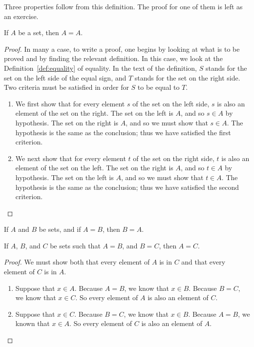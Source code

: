 \noindent Three properties follow from this definition. The proof for one of
them is left as an exercise.
\begin{lemma}
   If $A$ be a set, then $A = A$.
\label{lemma:set-identity}
   \begin{proof}
      In many a case, to write a proof, one begins by looking at what is to be
      proved and by finding the relevant definition. In this case, we look at
      the Definition~\ref{def:equality} of equality. In the text of the
      definition, $S$ stands for the set on the left side of the equal sign,
      and $T$ stands for the set on the right side. Two criteria must be
      satisfied in order for $S$ to be equal to $T$.
      \begin{enumerate}
         \item We first show that for every element $s$ of the set on the left
            side, $s$ is also an element of the set on the right.  The set on
            the left is $A$, and so $s \in A$ by hypothesis. The set on the
            right is $A$, and so we must show that $s \in A$. The hypothesis is
            the same as the conclusion; thus we have satisfied the first
            criterion.
         \item We next show that for every element $t$ of the set on the right
            side, $t$ is also an element of the set on the left.  The set on
            the right is $A$, and so $t \in A$ by hypothesis. The set on the
            left is $A$, and so we must show that $t \in A$.  The hypothesis is
            the same as the conclusion; thus we have satisfied the second
            criterion.
      \end{enumerate}
   \end{proof}
\end{lemma}

\begin{lemma}
   If $A$ and $B$ be sets, and if $A = B$, then $B = A$.
\label{lemma:set-reflexivity}
\end{lemma}

\begin{lemma}
   If $A$, $B$, and $C$ be sets such that $A = B$, and $B = C$, then $A = C$.
\label{lemma:set-transitivity}
   \begin{proof}
      We must show both that every element of $A$ is in $C$ and that every
      element of $C$ is in $A$.
      \begin{enumerate}
         \item Suppose that $x \in A$. Because $A = B$, we know that $x \in B$.
            Because $B = C$, we know that $x \in C$. So every element of $A$ is
            also an element of $C$.
         \item Suppose that $x \in C$. Because $B = C$, we know that $x \in B$.
            Because $A = B$, we known that $x \in A$. So every element of $C$
            is also an element of $A$.
      \end{enumerate}
   \end{proof}
\end{lemma}

